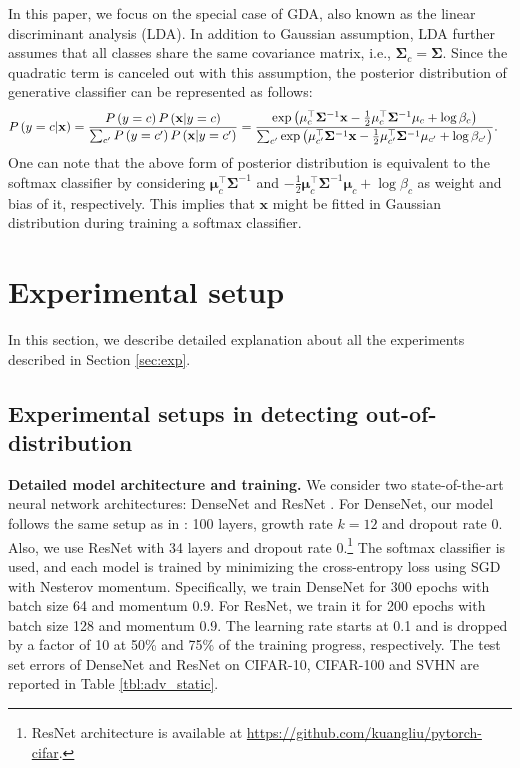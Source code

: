 \documentclass{article}
\begin{document}
In this paper, we focus on the special case of GDA, also known as the linear discriminant analysis (LDA). In addition to Gaussian assumption, LDA further assumes that all classes share the same covariance matrix, i.e., $\mathbf{\Sigma}_c = \mathbf{\Sigma}$. 
Since the quadratic term is canceled out with this assumption,
the posterior distribution of generative classifier can be represented as follows:
\begin{align*} & P\left(y=c|\mathbf{x}\right) = \frac{P\left( y = c \right) P\left(\mathbf{x}| y =c \right) }{\sum_{c^\prime}P\left( y= c^\prime \right) P\left(\mathbf{x}| y= c^\prime \right)} \notag = \frac{ \exp \left( \mathbf{\mu}_c^\top \mathbf{\Sigma}^{-1} \mathbf{x} -\frac{1}{2} \mathbf{\mu}_c^\top \mathbf{\Sigma}^{-1} \mathbf{\mu}_c +\log \beta_c \right) }{\sum_{c^\prime} \exp \left( \mathbf{\mu}_{c^\prime}^\top \mathbf{\Sigma}^{-1} \mathbf{x} -\frac{1}{2} \mathbf{\mu}_{c^\prime}^\top \mathbf{\Sigma}^{-1} \mathbf{\mu}_{c^\prime} +\log \beta_{c^\prime} \right)}.
\end{align*}
One can note that the above form of posterior distribution is equivalent to the softmax classifier by considering $\mathbf{\mu}_{c}^\top \mathbf{\Sigma}^{-1}$ and $ -\frac{1}{2} \mathbf{\mu}_c^\top \mathbf{\Sigma}^{-1} \mathbf{\mu}_c +\log \beta_c$ as weight and bias of it, respectively. This implies that $\mathbf{x}$ might be fitted in Gaussian distribution during training a softmax classifier.

\section{Experimental setup} \label{appendix:exp_setup}

In this section, we describe detailed explanation about all the experiments described in Section \ref{sec:exp}.

\subsection{Experimental setups in detecting out-of-distribution} \label{appendix:exp_setup_OOD}


{\bf Detailed model architecture and training.}
We consider two state-of-the-art neural network architectures: DenseNet \citep{huang2017densely} and ResNet \citep{he2016deep}.
For DenseNet, our model follows the same setup as in \citet{huang2017densely}: 100 layers, growth rate $k=12$ and dropout rate 0.
Also, we use ResNet with 34 layers and dropout rate 0.\footnote{ResNet architecture is available at \url{https://github.com/kuangliu/pytorch-cifar}.}
The softmax classifier is used, and each model is trained by minimizing the cross-entropy loss using SGD with Nesterov momentum. 
Specifically, we train DenseNet for 300 epochs with batch size 64 and momentum 0.9. 
For ResNet, we train it for 200 epochs with batch size 128 and momentum 0.9. 
The learning rate starts at 0.1 and is dropped by a factor of 10 at 50\% and 75\% of the training progress, respectively.
The test set errors of DenseNet and ResNet on CIFAR-10, CIFAR-100 and SVHN are reported in Table \ref{tbl:adv_static}.
\end{document}

